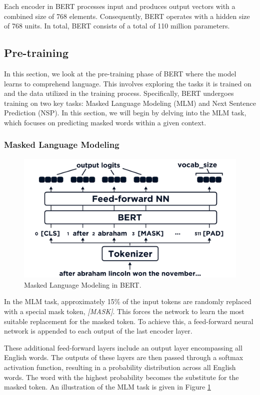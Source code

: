 \documentclass[12pt,oneside,bibtotoc,liststotoc]{scrbook}
\begin{document}
Each encoder in BERT processes input and produces output vectors with a combined size of 768 elements. Consequently, BERT operates with a hidden size of 768 units. In total, BERT consists of a total of 110 million parameters. \cite{bert}


\subsection{Pre-training}
In this section, we look at the pre-training phase of BERT where the model learns to comprehend language. This involves exploring the tasks it is trained on and the data utilized in the training process. Specifically, BERT undergoes training on two key tasks: Masked Language Modeling (MLM) and Next Sentence Prediction (NSP). In this section, we will begin by delving into the MLM task, which focuses on predicting masked words within a given context.

\subsubsection{Masked Language Modeling}
\begin{figure}
  \centering
  \includegraphics[width=12cm]{img/mlm_bert.png}
  \caption{Masked Language Modeling in BERT. \cite{bertMLM}}
  \label{fig:mlm_bert}
\end{figure}
In the MLM task, approximately 15\% of the input tokens are randomly replaced with a special mask token, \textit{[MASK]}. This forces the network to learn the most suitable replacement for the masked token. To achieve this, a feed-forward neural network is appended to each output of the last encoder layer.

These additional feed-forward layers include an output layer encompassing all English words. The outputs of these layers are then passed through a softmax activation function, resulting in a probability distribution across all English words. The word with the highest probability becomes the substitute for the masked token. An illustration of the MLM task is given in Figure \ref{fig:mlm_bert}
\end{document}
